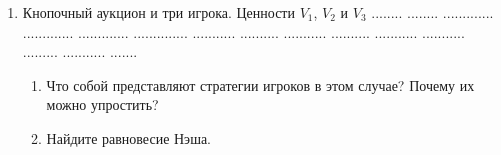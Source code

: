 \documentclass[11pt, openany]{book}
\numberwithin{equation}{page} %
\theoremstyle{definition} %
\theoremstyle{definition}
\theoremstyle{definition}
\begin{document}
\begin{enumerate}







\item Кнопочный аукцион и три игрока. Ценности $ V_{1} $, $ V_{2} $ и $ V_{3} $ ........ ........ ............. ............. ............. .............. ........... .......... ........... .......... ........... ........... ......... ........... .......
\begin{enumerate}
\item Что собой представляют стратегии игроков в этом случае? Почему их можно упростить?
\item Найдите равновесие Нэша.
\end{enumerate}
\end{enumerate}




\printindex



\nocite{nikolenko:tem, menesez:iat, krishna:at, milgrom:patw, klemperer:atp}


\end{document}
